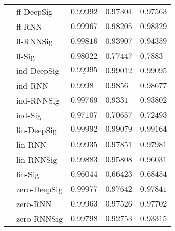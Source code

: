 \begin{tabular}{lllll}
       & ff-DeepSig &                           $ 0.99992 $ &                           $ 0.97304 $ &                           $ 0.97563 $ \\
       & ff-RNN &                           $ 0.99967 $ &                           $ 0.98205 $ &                           $ 0.98329 $ \\
       & ff-RNNSig &                           $ 0.99816 $ &                           $ 0.93907 $ &                           $ 0.94359 $ \\
       & ff-Sig &                           $ 0.98022 $ &                           $ 0.77447 $ &                            $ 0.7883 $ \\
       & ind-DeepSig &  $  \mathbf{ \underline{ 0.99995 }} $ &               $  \mathbf{ 0.99012 } $ &               $  \mathbf{ 0.99095 } $ \\
       & ind-RNN &                            $ 0.9998 $ &                            $ 0.9856 $ &                           $ 0.98677 $ \\
       & ind-RNNSig &                           $ 0.99769 $ &                            $ 0.9331 $ &                           $ 0.93802 $ \\
       & ind-Sig &                           $ 0.97107 $ &                           $ 0.70657 $ &                           $ 0.72493 $ \\
       & lin-DeepSig &            $  \underline{ 0.99992 } $ &  $  \mathbf{ \underline{ 0.99079 }} $ &  $  \mathbf{ \underline{ 0.99164 }} $ \\
       & lin-RNN &                           $ 0.99935 $ &                           $ 0.97851 $ &                           $ 0.97981 $ \\
       & lin-RNNSig &                           $ 0.99883 $ &                           $ 0.95808 $ &                           $ 0.96031 $ \\
       & lin-Sig &                           $ 0.96044 $ &                           $ 0.66423 $ &                           $ 0.68454 $ \\
       & zero-DeepSig &                           $ 0.99977 $ &                           $ 0.97642 $ &                           $ 0.97841 $ \\
       & zero-RNN &                           $ 0.99963 $ &                           $ 0.97526 $ &                           $ 0.97702 $ \\
       & zero-RNNSig &                           $ 0.99798 $ &                           $ 0.92753 $ &                           $ 0.93315 $ \\

\end{tabular}
